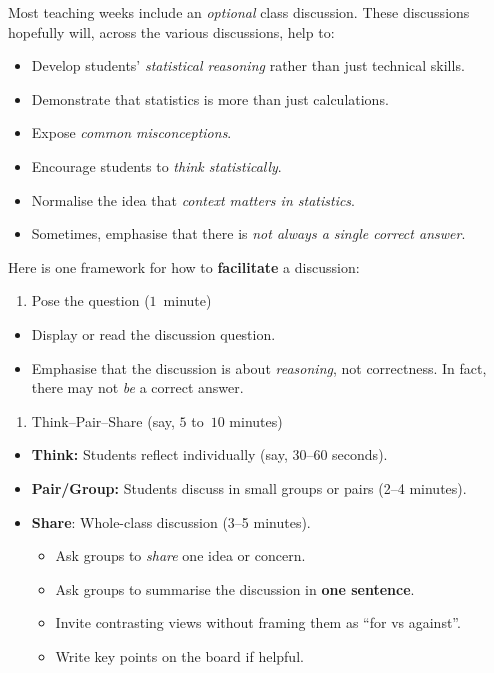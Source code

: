 \documentclass[
  11pt,
  a4paper,
  krantz2]{krantz}
\providecommand{\tightlist}{%
  \setlength{\itemsep}{0pt}\setlength{\parskip}{0pt}}
\begin{document}
Most teaching weeks include an \emph{optional} class discussion.
These discussions hopefully will, across the various discussions, help to:

\begin{itemize}
\tightlist
\item
  Develop students' \emph{statistical reasoning} rather than just technical skills.
\item
  Demonstrate that statistics is more than just calculations.
\item
  Expose \emph{common misconceptions}.
\item
  Encourage students to \emph{think statistically}.
\item
  Normalise the idea that \emph{context matters in statistics}.
\item
  Sometimes, emphasise that there is \emph{not always a single correct answer}.
\end{itemize}

Here is one framework for how to \textbf{facilitate} a discussion:

\begin{enumerate}
\def\labelenumi{\arabic{enumi}.}
\tightlist
\item
  Pose the question (\(1\)~minute)
\end{enumerate}

\begin{itemize}
\tightlist
\item
  Display or read the discussion question.
\item
  Emphasise that the discussion is about \emph{reasoning}, not correctness.
  In fact, there may not \emph{be} a correct answer.
\end{itemize}

\begin{enumerate}
\def\labelenumi{\arabic{enumi}.}
\setcounter{enumi}{1}
\tightlist
\item
  Think--Pair--Share (say, \(5\) to~\(10\) minutes)
\end{enumerate}

\begin{itemize}
\tightlist
\item
  \textbf{Think:} Students reflect individually (say, 30--60 seconds).
\item
  \textbf{Pair/Group:} Students discuss in small groups or pairs (2--4 minutes).
\item
  \textbf{Share}: Whole-class discussion (3--5 minutes).

  \begin{itemize}
  \tightlist
  \item
    Ask groups to \emph{share} one idea or concern.
  \item
    Ask groups to summarise the discussion in \textbf{one sentence}.
  \item
    Invite contrasting views without framing them as ``for vs against''.
  \item
    Write key points on the board if helpful.
  \end{itemize}
\end{itemize}
\end{document}
